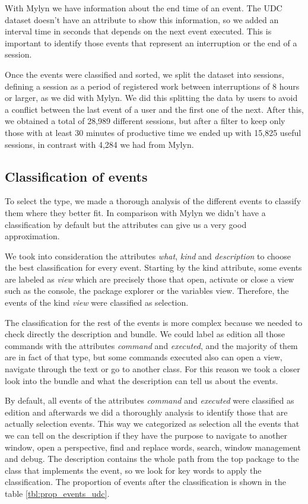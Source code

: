 \documentclass[conference]{IEEEtran}
\begin{document}
With Mylyn we have information about the end time of an event. The UDC dataset doesn't have an attribute to show this information, so we added an interval time in seconds that depends on the next event executed. This is important to identify those events that represent an interruption or the end of a session. 

Once the events were classified and sorted, we split the dataset into sessions, defining a session as a period of registered work between interruptions of 8 hours or larger, as we did with Mylyn. We did this splitting the data by users to avoid a conflict between the last event of a user and the first one of the next. After this, we obtained a total of 28,989 different sessions, but after a filter to keep only those with at least 30 minutes of productive time we ended up with 15,825 useful sessions, in contrast with 4,284 we had from Mylyn.

\subsection{Classification of events}
To select the type, we made a thorough analysis of the different events to classify them where they better fit. In comparison with Mylyn we didn't have a classification by default but the attributes can give us a very good approximation.

We took into consideration the attributes \textit{what}, \textit{kind} and \textit{description} to choose the best classification for every event. Starting by the kind attribute, some events are labeled as \textit{view} which are precisely those that open, activate or close a view such as the console, the package explorer or the variables view. Therefore, the events of the kind \textit{view} were classified as selection.

The classification for the rest of the events is more complex because we needed to check directly the description and bundle. We could label as edition all those commands with the attributes \textit{command} and \textit{executed}, and the majority of them are in fact of that type, but some commands executed also can open a view, navigate through the text or go to another class. For this reason we took a closer look into the bundle and what the description can tell us about the events.

By default, all events of the attributes \textit{command} and \textit{executed} were classified as edition and afterwards we did a thoroughly analysis to identify those that are actually selection events. This way we categorized as selection all the events that we can tell on the description if they have the purpose to navigate to another window, open a perspective, find and replace words, search, window management and debug. The description contains the whole path from the top package to the class that implements the event, so we look for key words to apply the classification. The proportion of events after the classification is shown in the table \ref{tbl:prop_events_udc}.
\end{document}

